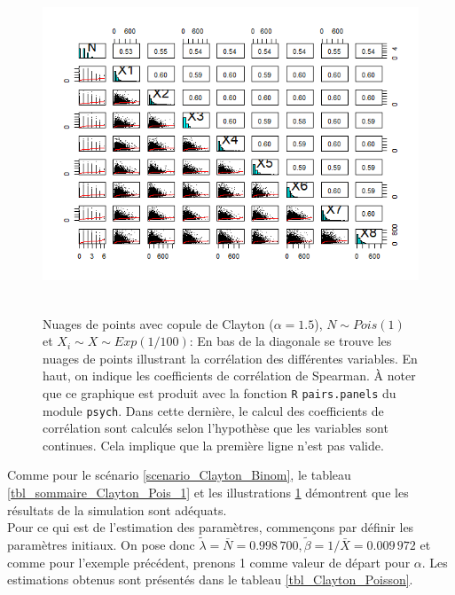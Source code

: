 \documentclass{article}
\begin{document}
		\begin{figure}[H]
			\centering
			\includegraphics[height=10cm]{Graph/scatterplot_Poisson_1.png}
			\caption[Nuages de points du scénario \ref{scenario_Clayton_Pois}]{Nuages de points avec copule de Clayton ($\alpha = 1.5$), $N\sim Pois(1)$ et $X_i \sim X\sim Exp(1/100)$:
			En bas de la diagonale se trouve les nuages de points illustrant la corrélation des différentes variables. En haut, on indique les coefficients de corrélation de Spearman. À noter que ce graphique est produit avec la fonction \texttt{R} \texttt{pairs.panels} du module \texttt{psych}. Dans cette dernière, le calcul des coefficients de corrélation sont calculés selon l'hypothèse que les variables sont  continues. Cela implique que la première ligne n'est pas valide.} 
			\label{graph_scatterplot_Poiss_1}
		\end{figure}
	
		Comme pour le scénario \ref{scenario_Clayton_Binom}, le tableau \ref{tbl_sommaire_Clayton_Pois_1} et les illustrations \ref{graph_scatterplot_Poiss_1} démontrent que les résultats de la simulation sont adéquats.\\
		
		Pour ce qui est de l'estimation des paramètres, commençons par définir les paramètres initiaux. On pose donc $\tilde{\lambda} = \bar{N} = 0.998\,700, \tilde{\beta} = 1/\bar{X}= 0.009\,972$ et comme pour l'exemple précédent, prenons 1 comme valeur de départ pour $\alpha$. Les estimations obtenus sont présentés dans le tableau \ref{tbl_Clayton_Poisson}.
		
\end{document}
